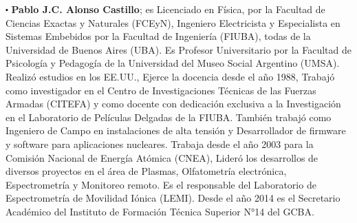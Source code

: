 \documentclass[
11pt, %
spanish,
singlespacing, %
parskip, %
headsepline, %
]{MastersDoctoralThesis} %
\begin{document}
\begin{sloppypar}
$\centerdot$ \textbf{Pablo J.C. Alonso Castillo}; es Licenciado en Física, por la Facultad de Ciencias Exactas y Naturales (FCEyN), Ingeniero Electricista y Especialista en Sistemas Embebidos por la Facultad de Ingeniería (FIUBA), todas de la Universidad de Buenos Aires (UBA). Es Profesor Universitario  por la Facultad de Psicología y Pedagogía de la Universidad del Museo Social Argentino (UMSA). Realizó estudios en los EE.UU., Ejerce la docencia desde el año 1988, Trabajó como investigador en el Centro de Investigaciones Técnicas de las Fuerzas Armadas (CITEFA) y como docente con dedicación exclusiva a la Investigación en el Laboratorio de Películas Delgadas de la FIUBA. También  trabajó como Ingeniero de Campo en instalaciones de alta tensión y Desarrollador de firmware y software para aplicaciones nucleares. Trabaja desde el año 2003 para la Comisión Nacional de Energía Atómica (CNEA), Lideró los desarrollos de diversos proyectos en el área de Plasmas, Olfatometría electrónica, Espectrometría y Monitoreo remoto. Es el responsable del Laboratorio de Espectrometría de Movilidad Iónica (LEMI). Desde el año 2014 es el Secretario Académico del Instituto de Formación Técnica Superior N°14 del GCBA.

\end{sloppypar}





\mainmatter %

\pagestyle{thesis} %






%





%
 
\end{document}
